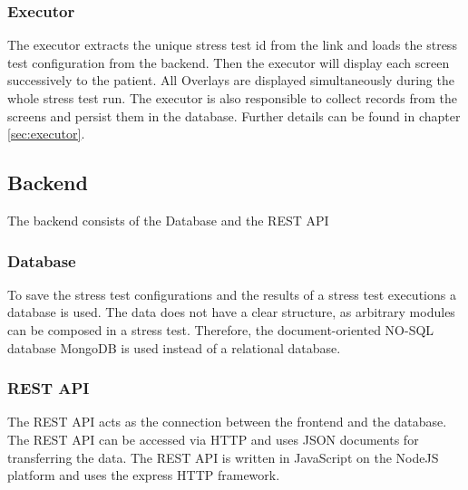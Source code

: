 \subsubsection*{Executor}
The executor extracts the unique stress test id from the link and loads the stress test configuration from the backend.
Then the executor will display each screen successively to the patient. 
All Overlays are displayed simultaneously during the whole stress test run.
The executor is also responsible to collect records from the screens and persist them in the database.
Further details can be found in chapter \ref{sec:executor}.

\subsection{Backend}
The backend consists of the Database and the REST API

\subsubsection*{Database}
To save the stress test configurations and the results of a stress test executions a database is used.
The data does not have a clear structure, as arbitrary modules can be composed in a stress test.
Therefore, the document-oriented NO-SQL database MongoDB is used instead of a relational database.

\subsubsection*{REST API}
The REST API acts as the connection between the frontend and the database.
The REST API can be accessed via HTTP and uses JSON documents for transferring the data.
The REST API is written in JavaScript on the NodeJS platform and uses the express HTTP framework.
